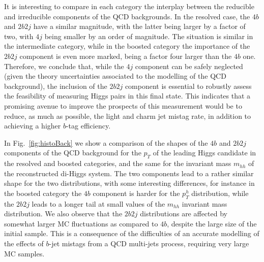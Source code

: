  It is interesting to compare in each category the interplay
 between the reducible and irreducible components of the
 QCD backgrounds.
 In the resolved case, the $4b$ and $2b2j$ have a similar
 magnitude, with the latter being larger by a factor of two,
 with $4j$ being smaller by an order of magnitude.
 The situation is similar in the intermediate category, while
 in the boosted category the importance of the $2b2j$ component
 is even more marked, being a factor four larger than the
 $4b$ one.
 Therefore, we conclude that, while the $4j$ component can be safely
 neglected (given the theory uncertainties associated to the
 modelling of the QCD background), the inclusion of the
 $2b2j$ component is essential to robustly assess the feasibility
 of measuring Higgs pairs in this final state.
 This indicates that a promising avenue to improve the prospects
 of this measurement would be to reduce, as much as possible,
 the light and charm jet mistag rate, in addition to achieving
 a higher $b$-tag efficiency.


 In Fig.~\ref{fig:histoBack} we show a
 comparison
    of the shapes of the $4b$ and $2b2j$
components of the QCD background for the $p_T$ of the leading
Higgs candidate in the resolved
and boosted  categories, and the same
 for the invariant
mass $m_{hh}$ of the
    reconstructed di-Higgs system.
    The two components lead to a rather similar shape
    for the two distributions, with some interesting
    differences, for instance in the boosted
    category the $4b$ component is harder for the
    $p_T^h$ distribution, while the $2b2j$ leads to a longer
    tail at small values of the $m_{hh}$ invariant
    mass distribution.
%
    We also observe that the $2b2j$ distributions
    are affected by somewhat larger
    MC fluctuations as compared to $4b$, despite the large size
of the initial sample.
%
This is a consequence of the
difficulties of an accurate modelling of the effects
of $b$-jet mistags from a QCD multi-jets process, requiring
very large MC samples.

